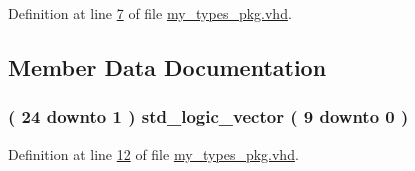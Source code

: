 Definition at line \hyperlink{my__types__pkg_8vhd_source_l00007}{7} of file \hyperlink{my__types__pkg_8vhd_source}{my\+\_\+types\+\_\+pkg.\+vhd}.



\subsection{Member Data Documentation}
\hypertarget{classmy__types__pkg_aa080951555b10a6a6e7b072b6e604da0}{}
\subsubsection[{A\+R\+R\+A\+Y\+\_\+10\+\_\+24}]{ {\bfseries \textcolor{vhdlchar}{(}\textcolor{vhdlchar}{ }\textcolor{vhdlchar}{ } \textcolor{vhdldigit}{24} \textcolor{vhdlchar}{ }\textcolor{keywordflow}{downto}\textcolor{vhdlchar}{ }\textcolor{vhdlchar}{ } \textcolor{vhdldigit}{1} \textcolor{vhdlchar}{ }\textcolor{vhdlchar}{)}\textcolor{vhdlchar}{ }\textcolor{vhdlchar}{ }\textcolor{comment}{std\+\_\+logic\+\_\+vector}\textcolor{vhdlchar}{ }\textcolor{vhdlchar}{(}\textcolor{vhdlchar}{ }\textcolor{vhdlchar}{ } \textcolor{vhdldigit}{9} \textcolor{vhdlchar}{ }\textcolor{keywordflow}{downto}\textcolor{vhdlchar}{ }\textcolor{vhdlchar}{ } \textcolor{vhdldigit}{0} \textcolor{vhdlchar}{ }\textcolor{vhdlchar}{)}\textcolor{vhdlchar}{ }} \hspace{0.3cm}{\ttfamily [Type]}}\label{classmy__types__pkg_aa080951555b10a6a6e7b072b6e604da0}


Definition at line \hyperlink{my__types__pkg_8vhd_source_l00012}{12} of file \hyperlink{my__types__pkg_8vhd_source}{my\+\_\+types\+\_\+pkg.\+vhd}.

\hypertarget{classmy__types__pkg_a78ba7d7de881309ad4de369e71c0eb63}{}
